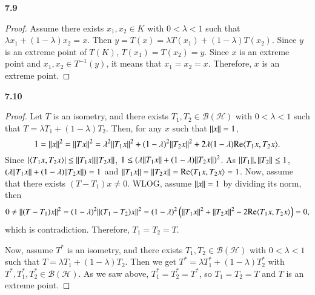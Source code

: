 \documentclass[a4paper, 12pt]{article}
\theoremstyle{Mydefinition}
\theoremstyle{Mytheorem}
\begin{document}
\noindent \textbf{7.9}
\begin{proof}
Assume there exists $x_1,x_2\in K$ with $0<\lambda<1$ such that $\lambda x_1+(1-\lambda)x_2 = x$. Then $y=T(x) = \lambda T(x_1)+(1-\lambda) T(x_2)$. Since $y$ is an extreme point of $T(K)$, $T(x_1)=T(x_2) = y$. Since $x$ is an extreme point and $x_1,x_2\in T^{-1}(y)$, it means that $x_1=x_2=x$. Therefore, $x$ is an extreme point.
\end{proof}

\noindent \textbf{7.10}
\begin{proof}
Let $T$ is an isometry, and there exists $T_1,T_2\in \mathscr{B}(\mathscr{H})$ with $0<\lambda<1$ such that $T=\lambda T_1+(1-\lambda)T_2$. Then, for any $x$ such that $\norm{x} = 1$,
\begin{equation}
    1 = \norm{x}^2 = \norm{Tx}^2 = \lambda^2\norm{T_1x}^2+(1-\lambda)^2\norm{T_2 x}^2 + 2\lambda(1-\lambda)\textrm{Re}\langle T_1x, T_2x\rangle.
\end{equation}
Since $\abs{\langle T_1x, T_2x\rangle}\leq \norm{T_1x}\norm{T_2x}$, $1\leq (\lambda\norm{T_1x}+(1-\lambda)\norm{T_2x})^2$. As $\norm{T_1}, \norm{T_2}\leq 1$, $(\lambda\norm{T_1x}+(1-\lambda)\norm{T_2x}) = 1$ and $\norm{T_1x}=\norm{T_2x} = \textrm{Re}\langle T_1x, T_2x\rangle = 1$. Now, assume that there exists $(T-T_1)x\neq 0$. WLOG, assume $\norm{x} = 1$ by dividing its norm, then
\begin{equation}
    0\neq \norm{(T-T_1)x}^2 = (1-\lambda)^2\norm{(T_1-T_2)x}^2 = (1-\lambda)^2\left(\norm{T_1x}^2+\norm{T_2x}^2-2\textrm{Re}\langle T_1x, T_2x\rangle \right) = 0,
\end{equation}
which is contradiction. Therefore, $T_1=T_2=T$.

Now, assume $T^*$ is an isometry, and there exists $T_1,T_2\in \mathscr{B}(\mathscr{H})$ with $0<\lambda<1$ such that $T=\lambda T_1+(1-\lambda)T_2$. Then we get $T^* = \lambda T_1^*+(1-\lambda)T_2^*$ with $T^*,T_1^*,T_2^*\in \mathscr{B}(\mathscr{H})$. As we saw above, $T_1^*=T_2^* = T^*$, so $T_1=T_2=T$ and $T$ is an extreme point.
\end{proof}
\end{document}
